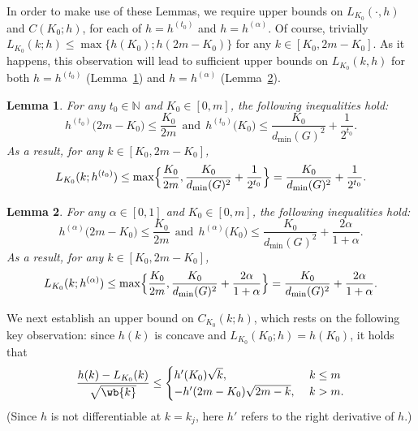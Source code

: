 \documentclass{article}
\newcommand{\1}{\mathbf{1}}
\newtheorem{lemma}{Lemma}[section]
\theoremstyle{definition}
\theoremstyle{remark}
\begin{document}
In order to make use of these Lemmas, we require upper bounds on $L_{K_0}(\cdot,h)$ and $C(K_0;h)$, for each of $h = h^{(t_0)}$ and $h = h^{(\alpha)}$. Of course, trivially $L_{K_0}(k;h) \leq \max\{h(K_0); h(2m - K_0)\}$ for any $k \in [K_0, 2m - K_0]$. As it happens, this observation will lead to sufficient upper bounds on $L_{K_0}(k,h)$ for both $h = h^{(t_0)}$ (Lemma~\ref{lem:interpolator_bound_rw}) and $h = h^{(\alpha)}$ (Lemma~\ref{lem:interpolator_bound_ppr}).  
\begin{lemma}
	\label{lem:interpolator_bound_rw}
	For any $t_0 \in \mathbb{N}$ and $K_0 \in [0,m]$, the following inequalities hold:
	\begin{equation}
	\label{eqn:interpolator_bound_rw}
	h^{(t_0)}\bigl(2m - K_0\bigr) \leq \frac{K_0}{2m}~~\textrm{and}~~h^{(t_0)}\bigl(K_0\bigr) \leq \frac{K_0}{d_{\min}(G)^2} + \frac{1}{2^{t_0}}.
	\end{equation}
	As a result, for any $k \in [K_0, 2m - K_0]$,
	\begin{equation}
	\label{eqn:interpolator_bound_rw_2}
	L_{K_0}(k;h^{(t_0)}) \leq \max\Bigl\{\frac{K_0}{2m}, \frac{K_0}{d_{\min}(G)^2} + \frac{1}{2^{t_0}}\Bigr\} = \frac{K_0}{d_{\min}(G)^2} + \frac{1}{2^{t_0}}.
	\end{equation}
\end{lemma}

\begin{lemma}
	\label{lem:interpolator_bound_ppr}
	For any $\alpha \in [0,1]$ and $K_0 \in [0,m]$, the following inequalities hold:
	\begin{equation}
	\label{eqn:interpolator_bound_ppr}
	h^{(\alpha)}\bigl(2m - K_0\bigr) \leq \frac{K_0}{2m}~~\textrm{and}~~h^{(\alpha)}\bigl(K_0\bigr) \leq \frac{K_0}{d_{\min}(G)^2} + \frac{2\alpha}{1 + \alpha}.
	\end{equation}
	As a result, for any $k \in [K_0, 2m - K_0]$,
	\begin{equation}
	\label{eqn:interpolator_bound_ppr_2}
	L_{K_0}(k;h^{(\alpha)}) \leq \max\Bigl\{\frac{K_0}{2m}, \frac{K_0}{d_{\min}(G)^2} + \frac{2\alpha}{1 + \alpha}\Bigr\} = \frac{K_0}{d_{\min}(G)^2} + \frac{2\alpha}{1 + \alpha}.
	\end{equation}
\end{lemma}

We next establish an upper bound on $C_{K_0}(k;h)$, which rests on the following key observation: since $h(k)$ is concave and $L_{K_0}(K_0;h) = h(K_0)$, it holds that
\begin{equation}
\label{pf:linearization_bound_1}
\frac{h(k) - L_{K_0}(k)}{\sqrt{\wb{k}}} \leq
\begin{cases}
h'(K_0) \sqrt{k},~& k \leq m \\
-h'(2m - K_0) \sqrt{2m - k},~& k > m.
\end{cases}
\end{equation}
(Since $h$ is not differentiable at $k = k_j$, here $h'$ refers to the right derivative of $h$.)  
\end{document}
